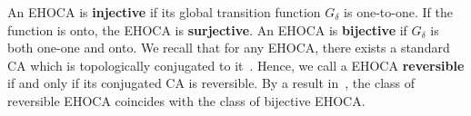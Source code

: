 \documentclass[submission,copyright,creativecommons]{eptcs}
\makeatletter
\newcommand{\ie}{\emph{i.e.}\@\xspace}
\newcommand{\zo}{\set{0,1}}
\newcommand{\structure}[1]{\ensuremath{\left\langle#1\right\rangle}\xspace}
\newcommand{\set}[1]{\ensuremath{\left\{#1\right\}}\xspace}
\newcommand{\N}{\ensuremath{\mathbb{N}}\xspace}
\newcommand{\Z}{\ensuremath{\mathbb{Z}}\xspace}
\newcommand{\GF}[1]{\ensuremath{G_{#1}}\xspace}
\makeatother
\begin{document}
%

An EHOCA is \textbf{injective} if its global transition function $\GF{\delta}$ is one-to-one. If the function is onto, the EHOCA is \textbf{surjective}. An EHOCA is \textbf{bijective} if $\GF{\delta}$ is both one-one and onto. We recall that
for any EHOCA, there exists a standard CA which is topologically conjugated
to it~\cite{DennunzioFMMP19}. Hence, we call
a EHOCA \textbf{reversible} if and only if its conjugated CA is reversible.
By a result in~\cite{hedlund1969}, the class of reversible EHOCA coincides
with the class of bijective EHOCA. 
\end{document}
